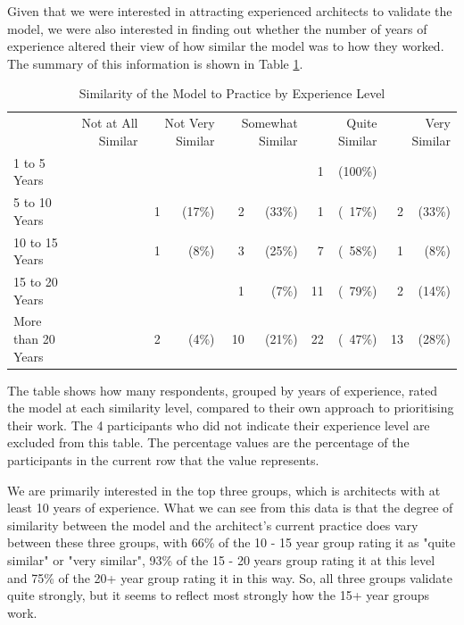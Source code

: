 Given that we were interested in attracting experienced architects to validate the model, we were also interested in finding out whether the number of years of experience altered their view of how similar the model was to how they worked.  The summary of this information is shown in Table \ref{table:similaritybyexp}.


\begin{table}
\caption{Similarity of the Model to Practice by Experience Level}
\label{table:similaritybyexp}
\footnotesize
\begin{tabular}{l rrrrrrrrrr}
                & \multicolumn{2}{P{1.5cm}}{Not at All Similar} & \multicolumn{2}{P{1.5cm}}{Not Very Similar} & \multicolumn{2}{P{1.5cm}}{Somewhat Similar} & \multicolumn{2}{P{1.5cm}}{Quite Similar} & \multicolumn{2}{P{1.5cm}}{Very Similar} \\
1 to 5 Years       && &   &        &    &       & 1  & (100\%) &	&        \\
5 to 10 Years      && & 1 & (17\%) & 2  &(33\%) & 1  & (~17\%) & 2  & (33\%) \\
10 to 15 Years     && & 1 & (8\%)  & 3  &(25\%) & 7  & (~58\%) & 1  & (8\%)  \\
15 to 20 Years     && &   &        & 1  &(7\%)  & 11 & (~79\%) & 2  & (14\%) \\
More than 20 Years && & 2 & (4\%)  & 10 &(21\%) & 22 & (~47\%) & 13 & (28\%) \\
\end{tabular}
\end{table}

The table shows how many respondents, grouped by years of experience, rated the model at each similarity level, compared to their own approach to prioritising their work.  The 4 participants who did not indicate their experience level are excluded from this table.  The percentage values are the percentage of the participants in the current row that the value represents.

We are primarily interested in the top three groups, which is architects with at least 10 years of experience.  What we can see from this data is that the degree of similarity between the model and the architect's current practice does vary between these three groups, with 66\% of the 10 - 15 year group rating it as "quite similar" or "very similar", 93\% of the 15 - 20 years group rating it at this level and 75\% of the 20+ year group rating it in this way.  So, all three groups validate quite strongly, but it seems to reflect most strongly how the 15+ year groups work.

